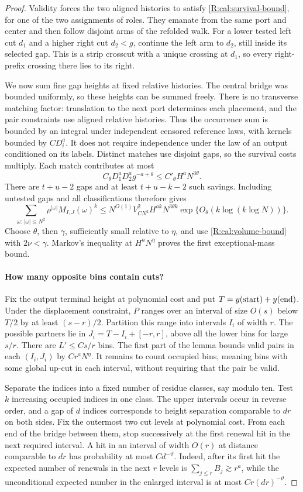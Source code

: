 \begin{proof}
Validity forces the two aligned histories to satisfy
\eqref{R:cal:survival-bound}, for one of the two assignments of roles.
They emanate from the same port and center and then follow disjoint
arms of the refolded walk. For a lower tested left cut $d_1$ and a
higher right cut $d_2<g$, continue the left arm to $d_2$, still inside
its selected gap. This is a strip crosscut with a unique crossing at
$d_1$, so every right-prefix crossing there lies to its right.

We now sum fine gap heights at fixed relative histories. The central
bridge was bounded uniformly, so these heights can be summed freely.
There is no transverse matching factor: translation to the next port
determines each placement, and the pair constraints use aligned relative
histories. Thus the occurrence sum is bounded by an integral under
independent censored reference laws, with kernels bounded by $CD_i^a$.
It does not require independence under the law of an output conditioned
on its labels. Distinct matches use disjoint gaps, so the survival costs
multiply. Each match contributes at most
\[
 C_\theta D_1^aD_2^a g^{-a+\theta}
       \le C'_\theta H^aN^{3\theta}.
\]
There are $t+u-2$ gaps and at least $t+u-k-2$ such savings. Including
untested gaps and all classifications therefore gives
\[
 \sum_{\omega:\,|\omega|\le N^2}
       \rho^{|\omega|}M_{I,J}(\omega)^k
 \le N^{O(1)}V_{CN^2}^2 H^{ak}N^{3\theta k}
       \exp\{O_\theta(k\log(k\log N))\}.
\]
Choose $\theta$, then $\gamma$, sufficiently small relative to $\eta$,
and use \eqref{R:cal:volume-bound} with $2\nu<\gamma$. Markov's
inequality at $H^aN^\eta$ proves the first exceptional-mass bound.

\paragraph{How many opposite bins contain cuts?}
Fix the output terminal height at polynomial cost and put
$T=y({\rm start})+y({\rm end})$. Under the displacement constraint,
$P$ ranges over an interval of size $O(s)$ below $T/2$ by at least
$(s-r)/2$. Partition this range into intervals $I_i$ of width $r$.
The possible partners lie in $J_i=T-I_i+[-r,r]$, above all the lower
bins for large $s/r$. There are $L'\le Cs/r$ bins. The first part of
the lemma bounds valid pairs in each $(I_i,J_i)$ by $Cr^aN^\eta$.
It remains to count occupied bins, meaning bins with some global
up-cut in each interval, without requiring that the pair be valid.

Separate the indices into a fixed number of residue classes, say
modulo ten. Test $k$ increasing occupied indices in one class. The
upper intervals occur in reverse order, and a gap of $d$ indices
corresponds to height separation comparable to $dr$ on both sides.
Fix the outermost two cut levels at polynomial cost. From each end
of the bridge between them, stop successively at the first renewal
hit in the next required interval. A hit in an interval of width
$O(r)$ at distance comparable to $dr$ has probability at most
$Cd^{-\vartheta}$. Indeed, after its first hit the expected number
of renewals in the next $r$ levels is
$\sum_{j\le r}B_j\gtrsim r^a$, while the unconditional expected number
in the enlarged interval is at most $Cr(dr)^{-\vartheta}$.


\end{proof}
